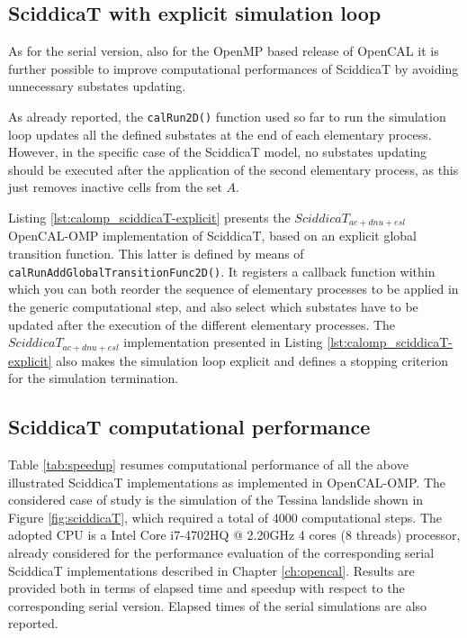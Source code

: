 \subsection{SciddicaT with explicit simulation loop}

As for the serial version, also for the OpenMP based release of
OpenCAL it is further possible to improve computational performances of
SciddicaT by avoiding unnecessary substates updating.

As already reported, the \verb'calRun2D()' function used so far to
run the simulation loop updates all the defined substates at the end
of each elementary process. However, in the specific case of the
SciddicaT model, no substates updating should be executed after
the application of the second elementary process, as this just removes
inactive cells from the set $A$.

Listing \ref{lst:calomp_sciddicaT-explicit} presents the
$SciddicaT_{ac+dnu+esl}$ OpenCAL-OMP implementation of SciddicaT,
based on an explicit global transition function. This latter is
defined by means of \verb'calRunAddGlobalTransitionFunc2D()'. It
registers a callback function within which you can both reorder the
sequence of elementary processes to be applied in the generic
computational step, and also select which substates have to be updated
after the execution of the different elementary processes. The
$SciddicaT_{ac+dnu+esl}$ implementation presented in Listing
\ref{lst:calomp_sciddicaT-explicit} also makes the simulation loop
explicit and defines a stopping criterion for the simulation
termination.



\subsection{SciddicaT computational performance}

Table \ref{tab:speedup} resumes computational performance of all the
above illustrated SciddicaT implementations as implemented in
OpenCAL-OMP. The considered case of study is the simulation of the
Tessina landslide shown in Figure \ref{fig:sciddicaT}, which required
a total of 4000 computational steps. The adopted CPU is a Intel Core
i7-4702HQ @ 2.20GHz 4 cores (8 threads) processor, already considered
for the performance evaluation of the corresponding serial SciddicaT
implementations described in Chapter \ref{ch:opencal}. Results are
provided both in terms of elapsed time and speedup with respect to
the corresponding serial version. Elapsed times of the serial
simulations are also reported.

